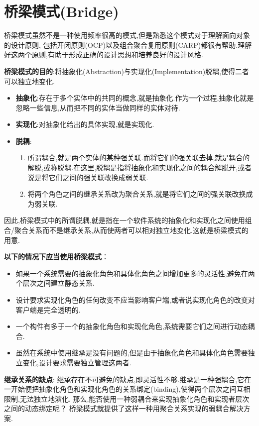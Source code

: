 \documentclass[../main.tex]{subfiles}
\begin{document}
\section{桥梁模式(Bridge)}
桥梁模式虽然不是一种使用频率很高的模式,但是熟悉这个模式对于理解面向对象的设计原则,
包括开闭原则(OCP)以及组合聚合复用原则(CARP)都很有帮助.理解好这两个原则,有助于形成正确的设计思想和培养良好的设计风格.

\textbf{桥梁模式的目的}:将抽象化(Abstraction)与实现化(Implementation)脱耦,使得二者可以独立地变化.
%
\begin{itemize}
  \item \textbf{抽象化}:存在于多个实体中的共同的概念,就是抽象化.作为一个过程,抽象化就是忽略一些信息,从而把不同的实体当做同样的实体对待.
  \item \textbf{实现化}:对抽象化给出的具体实现,就是实现化.
  \item \textbf{脱耦}:
    \begin{enumerate}
      \item 所谓耦合,就是两个实体的某种强关联.而将它们的强关联去掉,就是耦合的解脱,或称脱耦.在这里,脱耦是指将抽象化和实现化之间的耦合解脱开,或者说是将它们之间的强关联改换成弱关联.
      \item 将两个角色之间的继承关系改为聚合关系,就是将它们之间的强关联改换成为弱关联.
    \end{enumerate}
\end{itemize}
%
因此,桥梁模式中的所谓脱耦,就是指在一个软件系统的抽象化和实现化之间使用组合/聚合关系而不是继承关系,从而使两者可以相对独立地变化.这就是桥梁模式的用意.

\textbf{以下的情况下应当使用桥梁模式}：
\begin{itemize}
  \item 如果一个系统需要的抽象化角色和具体化角色之间增加更多的灵活性,避免在两个层次之间建立静态关系.
  \item 设计要求实现化角色的任何改变不应当影响客户端,或者说实现化角色的改变对客户端是完全透明的.
  \item 一个构件有多于一个的抽象化角色和实现化角色,系统需要它们之间进行动态耦合.
  \item 虽然在系统中使用继承是没有问题的,但是由于抽象化角色和具体化角色需要独立变化,设计要求需要独立管理这两者.
\end{itemize}
%
\textbf{继承关系的缺点}:
继承存在不可避免的缺点,即灵活性不够.继承是一种强耦合,它在一开始便把抽象化角色和实现化角色的关系绑定(binding),使得两个层次之间互相限制,无法独立地演化.
那么,能否使用一种弱耦合来实现抽象化角色和实现者层次之间的动态绑定呢？
桥梁模式就提供了这样一种用聚合关系实现的弱耦合解决方案.
%
\end{document}
